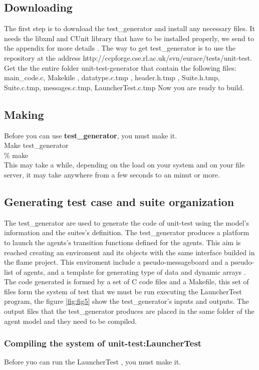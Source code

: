 \documentclass[a4paper,10pt]{article}
\begin{document}
\subsection{Downloading}
The first step is to download the test\_generator and install any necessary files. 
It needs the  libxml and CUnit library that have to be installed properly, we send to the appendix for more details .
The  way to get test\_generator is to use the repository at the address  http://ccpforge.cse.rl.ac.uk/svn/eurace/tests/unit-test. 
Get the the entire folder unit-test-generator that contain the following files:
main\_code.c, Makekile , datatype.c.tmp , header.h.tmp , Suite.h.tmp,
Suite.c.tmp, messages.c.tmp, LauncherTest.c.tmp
Now you are ready to build.
\subsection{Making}
Before you can use \textbf{test\_generator}, you must make it. \\
Make test\_generator\\
\% make \\
This may take a while, depending on the load on your system and on your file server,
it may take anywhere from a few seconds to an minut or more.
\subsection{Generating test case and suite organization}
The test\_generator are used to generate the code of unit-test using the model's information and the suites's definition.
The test\_generator  produces a platform to launch the agents's transition functions defined for the agents. This aim is reached creating an enviroment and its objects with the same interface builded in the flame project. This enviroment include a pseudo-messageboard and a pseudo-list of agents, and a template for generating  type of data and dynamic arrays .   
The code generated is formed by a set of  C code files and a Makefile, this set of files form the system of test that we must be run executing the LauncherTest program, the figure \ref{fig:fig5} show the test\_generator's inputs and outputs. The output files that the test\_generator produces are placed in the same folder of the agent model and they need to be compiled.
\subsubsection{Compiling the system of unit-test:LauncherTest }
Before yuo can run the LauncherTest , you must make it.
\end{document}
